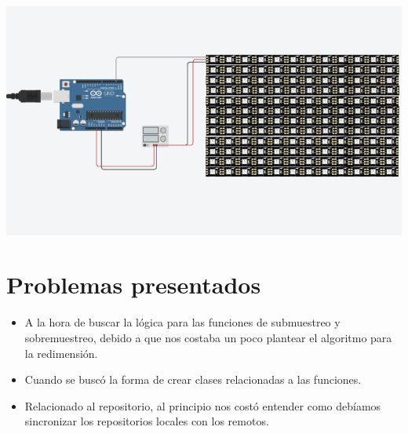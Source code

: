 \documentclass{article}
\begin{document}
\includegraphics{images/Circuito.png}

\section{Problemas presentados}
\begin{itemize}

\item A la hora de buscar la lógica para las funciones de submuestreo y sobremuestreo, debido a que nos costaba un poco plantear el algoritmo para la redimensión.

\item Cuando se buscó la forma de crear clases relacionadas a las funciones.

\item Relacionado al repositorio, al principio nos costó entender como debíamos sincronizar los repositorios locales con los remotos.



\end{itemize}
\end{document}
